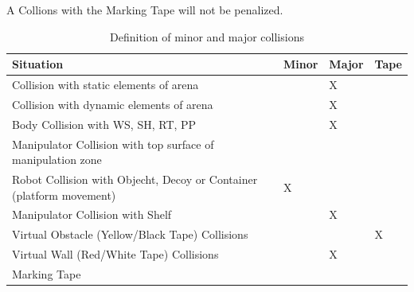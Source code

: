 A Collions with the Marking Tape will not be penalized.


\begin{table}[h!]
	\caption{Definition of minor and major collisions}
	\label{tab:collisions}
	\centering
	\begin{tabular}{|p{10cm}|p{1cm}|p{1cm}|p{1.5cm}|}
		\hline
		Situation                                                & Minor & Major &  Tape \\
		\hline
		Collision with static elements of arena                  &       & X     &              \\
		Collision with dynamic elements of arena                 &       & X     &              \\
		Body Collision with WS, SH, RT, PP                     &       & X     &              \\
		Manipulator Collision with top surface of manipulation zone       &       &       &              \\
		Robot Collision with Objecht, Decoy or Container (platform movement)    &  X     &       &              \\

		Manipulator Collision with Shelf                   &      & X      &              \\
		Virtual Obstacle (Yellow/Black Tape) Collisions          &       &       & X            \\
		Virtual Wall (Red/White Tape) Collisions                 &       & X     &              \\
		Marking Tape & & & \\
		\hline
	\end{tabular}
\end{table}


